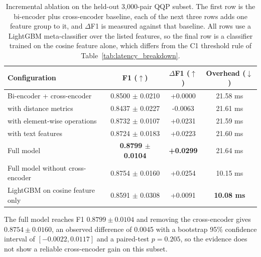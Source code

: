 \documentclass[authoryear,preprint,review,12pt]{elsarticle}
\begin{document}
\begin{table}[htbp]
\centering
\caption{Incremental ablation on the held-out 3,000-pair QQP subset. The first row is the bi-encoder plus cross-encoder baseline, each of the next three rows adds one feature group to it, and $\Delta$F1 is measured against that baseline. All rows use a LightGBM meta-classifier over the listed features, so the final row is a classifier trained on the cosine feature alone, which differs from the C1 threshold rule of Table~\ref{tab:latency_breakdown}.}
\label{tab:ablation_incremental}
\footnotesize
\begin{tabular}{lccc}
\toprule
Configuration & F1 ($\uparrow$) & $\Delta$F1 ($\uparrow$) & Overhead ($\downarrow$) \\
\midrule
Bi-encoder + cross-encoder & 0.8500 $\pm$ 0.0210 & +0.0000 & 21.58 ms \\
\quad with distance metrics & 0.8437 $\pm$ 0.0227 & -0.0063 & 21.61 ms \\
\quad with element-wise operations & 0.8732 $\pm$ 0.0107 & +0.0231 & 21.59 ms \\
\quad with text features & 0.8724 $\pm$ 0.0183 & +0.0223 & 21.60 ms \\
Full model & \textbf{0.8799 $\pm$ 0.0104} & \textbf{+0.0299} & 21.64 ms \\
Full model without cross-encoder & 0.8754 $\pm$ 0.0160 & +0.0254 & 10.15 ms \\
LightGBM on cosine feature only & 0.8591 $\pm$ 0.0308 & +0.0091 & \textbf{10.08 ms} \\
\bottomrule
\end{tabular}
\end{table}
The full model reaches F1 $0.8799\pm0.0104$ and removing the cross-encoder gives $0.8754\pm0.0160$, an observed difference of 0.0045 with a bootstrap 95\% confidence interval of $[-0.0022,0.0117]$ and a paired-test $p=0.205$, so the evidence does not show a reliable cross-encoder gain on this subset.
\end{document}
